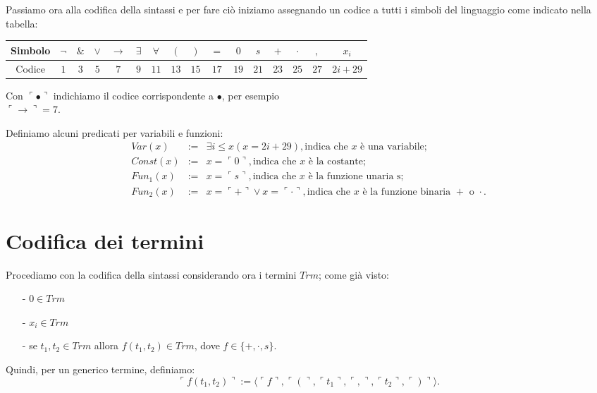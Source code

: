 Passiamo ora alla codifica della sintassi e per fare ci\`o iniziamo assegnando un codice a tutti i simboli del linguaggio come indicato nella tabella:

\vspace{0.5cm}

\begin{tabular}{|c|c|c|c|c|c|c|c|c|c|c|c|c|c|c|c|}
\hline
Simbolo & $\neg$ & $\&$ & $\vee$ & $\rightarrow$ & $\exists$ & $\forall$ & $($ & $)$ & $=$ & $0$ & $s$ & $+$ & $\cdot$ & $,$ & $x_i$ \\
\hline
Codice  & $1$ & $3$ & $5$ & $7$ & $9$ & $11$ & $13$ & $15$ & $17$ & $19$ & $21$ & $23$ & $25$ & $27$ & $2 i+29$\\
\hline
\end{tabular}
\vspace{0.5cm}

Con $\ulcorner \bullet \urcorner$ indichiamo il codice corrispondente a $\bullet$, per esempio \\ $\ulcorner \rightarrow \urcorner = 7$.

Definiamo alcuni predicati per variabili e funzioni:
\begin{eqnarray*}
Var(x) &:=& \exists i \leq x(x=2i+29), \text{indica che $x$ \`e una variabile;} \\
Const(x) &:=& x=  \ulcorner 0  \urcorner, \text{indica che $x$ \`e la costante;}\\
Fun_1(x) &:=& x=  \ulcorner s \urcorner, \text{indica che $x$ \`e la funzione unaria s;}\\
Fun_2(x) &:=& x=  \ulcorner  + \urcorner \vee  x= \ulcorner \cdot \urcorner, \text{indica che $x$ \`e la funzione binaria $+$ o $\cdot$.}
\end{eqnarray*}

 \section{Codifica dei termini}
Procediamo con la codifica della sintassi considerando ora i termini $Trm$; come gi\`a visto:
\begin{itemize}

\item[-]{$0 \in Trm$}
\item[-]{$x_i \in Trm$}
\item[-]{se $t_1, t_2 \in Trm$ allora $f(t_1,t_2) \in Trm$, dove $f\in \{+, \cdot, s\}$}.
\end{itemize}



Quindi, per un generico termine, definiamo:
\begin{displaymath}
 \ulcorner f(t_1,t_2) \urcorner :=  \langle  \ulcorner f \urcorner,  \ulcorner ( \urcorner,  \ulcorner t_1 \urcorner,  \ulcorner , \urcorner,  \ulcorner t_2 \urcorner ,  \ulcorner ) \urcorner\rangle .
\end{displaymath}

